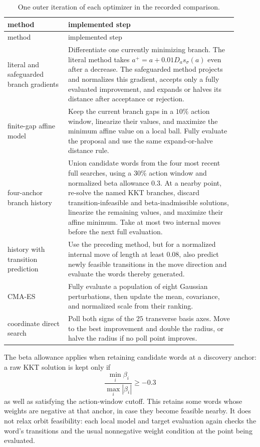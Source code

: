 \begingroup
\small
\begin{longtable}{@{}>{\raggedright\arraybackslash}p{0.24\linewidth}p{0.67\linewidth}@{}}
\caption{One outer iteration of each optimizer in the recorded
comparison.}
\label{tab:black-box-datascience-f10-optimizer-steps}\\
\toprule
method & implemented step\\
\midrule
\endfirsthead
\toprule
method & implemented step\\
\midrule
\endhead
literal and safeguarded branch gradients
& Differentiate one currently minimizing branch.  The literal method takes
  \(a^+=a+0.01D_as_\sigma(a)\) even after a decrease.  The safeguarded method
  projects and normalizes this gradient, accepts only a fully evaluated
  improvement, and expands or halves its distance after acceptance or
  rejection.\\
finite-gap affine model
& Keep the current branch gaps in a \(10\%\) action window, linearize their
  values, and maximize the minimum affine value on a local ball.  Fully
  evaluate the proposal and use the same expand-or-halve distance rule.\\
four-anchor branch history
& Union candidate words from the four most recent full searches, using a
  \(30\%\) action window and normalized beta allowance \(0.3\).  At a nearby
  point, re-solve the named KKT branches, discard transition-infeasible and
  beta-inadmissible solutions, linearize the remaining values, and maximize
  their affine minimum.  Take at most two internal moves before the next full
  evaluation.\\
history with transition prediction
& Use the preceding method, but for a normalized internal move of length at
  least \(0.08\), also predict newly feasible transitions in the move
  direction and evaluate the words thereby generated.\\
CMA-ES
& Fully evaluate a population of eight Gaussian perturbations, then update
  the mean, covariance, and normalized scale from their ranking.\\
coordinate direct search
& Poll both signs of the \(25\) transverse basis axes.  Move to the best
  improvement and double the radius, or halve the radius if no poll point
  improves.\\
\bottomrule
\end{longtable}
\endgroup

The beta allowance applies when retaining candidate words at a discovery
anchor: a raw KKT solution is kept only if
\[
 \frac{\min_i\beta_i}{\max_i|\beta_i|}\geq-0.3
\]
as well as satisfying the action-window cutoff. This retains some words
whose weights are negative at that anchor, in case they become feasible
nearby. It does not relax orbit feasibility: each local model and target
evaluation again checks the word's transitions and the usual nonnegative
weight condition at the point being evaluated.

